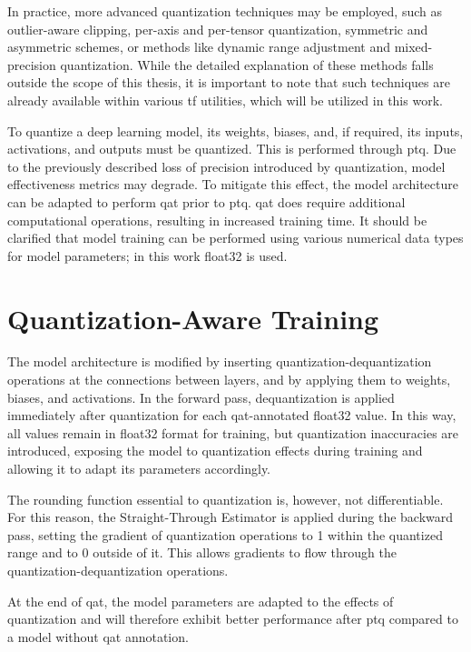 {In practice, more advanced quantization techniques may be employed, such as outlier-aware clipping, per-axis and per-tensor quantization,
symmetric and asymmetric schemes, or methods like dynamic range adjustment and mixed-precision quantization.
While the detailed explanation of these methods falls outside the scope of this thesis,
it is important to note that such techniques are already available within various \gls{tf} \cite{tfPaper} utilities, which will be utilized in this work.

To quantize a deep learning model, its weights, biases, and, if required, its inputs, activations, and outputs must be quantized. This is performed through \gls{ptq}.
Due to the previously described loss of precision introduced by quantization, model effectiveness metrics may degrade.
To mitigate this effect, the model architecture can be adapted to perform \gls{qat} prior to \gls{ptq}.
\gls{qat} does require additional computational operations, resulting in increased training time.
It should be clarified that model training can be performed using various numerical data types for model parameters; in this work \gls{float32} is used.

\section{Quantization-Aware Training}
\label{subsubsec:qat}

The model architecture is modified by inserting quantization-dequantization operations at the connections between layers,
and by applying them to weights, biases, and activations.
In the forward pass, dequantization is applied immediately after quantization for each \gls{qat}-annotated \gls{float32} value.
In this way, all values remain in \gls{float32} format for training,
but quantization inaccuracies are introduced, exposing the model to quantization effects during training and allowing it to adapt its parameters accordingly.

The rounding function essential to quantization is, however, not differentiable. For this reason, the Straight-Through Estimator \cite{MLQuantization2} is applied during the backward pass,
setting the gradient of quantization operations to 1 within the quantized range and to 0 outside of it.
This allows gradients to flow through the quantization-dequantization operations.

At the end of \gls{qat},
the model parameters are adapted to the effects of quantization and will therefore exhibit better performance after \gls{ptq} compared to a model without \gls{qat} annotation.

}
